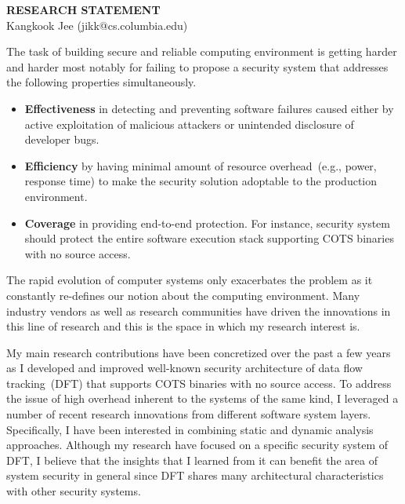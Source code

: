 \documentclass[letterpaper, 10pt]{article}
\begin{document}
\begin{small}

\begin{center}
{\LARGE \bf RESEARCH STATEMENT}\\
\vspace*{0.1cm}
{\normalsize Kangkook Jee (jikk@cs.columbia.edu)}
\end{center}



The task of building secure and reliable computing environment is getting
harder and harder most notably for failing to propose a security system that
addresses the following properties simultaneously.

\begin{itemize}

        \item {\bf Effectiveness} in detecting and preventing software failures
                caused either by active exploitation of malicious attackers or
                unintended disclosure of developer bugs.

        \item {\bf Efficiency} by having minimal amount of resource
                overhead~(e.g., power, response time) to make the security
                solution adoptable to the production environment.

        \item {\bf Coverage} in providing end-to-end protection. For instance,
                security system should protect the entire software execution
                stack supporting COTS binaries with no source access.

\end{itemize}

The rapid evolution of computer systems only exacerbates the problem as it
constantly re-defines our notion about the computing environment.
%
Many industry vendors as well as research communities have driven the
innovations in this line of research and this is the
space in which my research interest is.

My main research contributions have been concretized over the past a few years
as I developed and improved well-known security architecture of data flow
tracking~(DFT) that supports COTS binaries with no source access.
%
To address the issue of high overhead inherent to the systems of the same kind,
I leveraged a number of recent research innovations from different software
system layers. Specifically, I have been interested in combining static and
dynamic analysis approaches.
%
Although my research have focused on a specific security system of DFT, I
believe that the insights that I learned from it can benefit the area of system
security in general since DFT shares many architectural characteristics with
other security systems.


\end{small}
\end{document}
